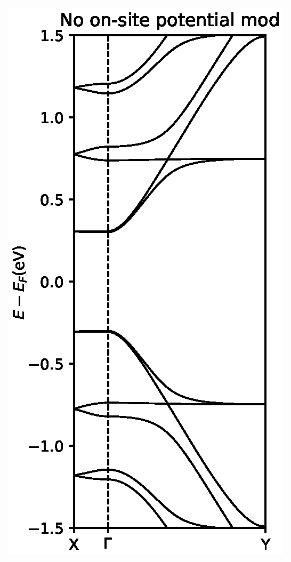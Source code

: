 \begin{figure}[H]
\begin{subfigure}[b]{0.3\textwidth}
		\centering
		\includegraphics[width=0.8\textwidth]{Figures/PS4Onomod.eps}
		\vspace{-2\baselineskip}
		\caption{}
		\label{PS4Odevnomod}
	\end{subfigure}
	\hspace{-30pt}
	\begin{subfigure}[b]{0.3\textwidth}
		\centering

\end{subfigure}
\end{figure}
